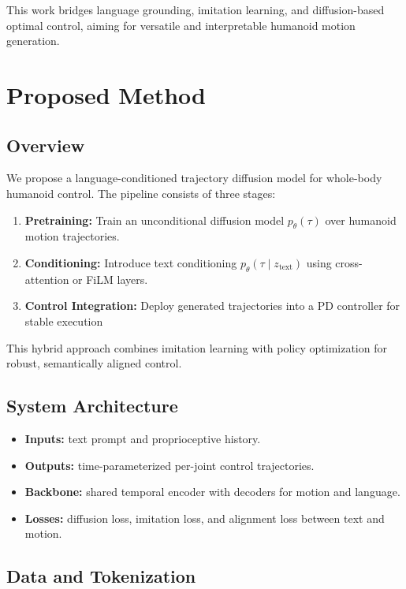 \documentclass{article}
\begin{document}
This work bridges language grounding, imitation learning, and diffusion-based optimal control, aiming for versatile and interpretable humanoid motion generation.

\section{Proposed Method}
\label{sec:method}

\subsection{Overview}

We propose a language-conditioned trajectory diffusion model for whole-body humanoid control. 
The pipeline consists of three stages:

\begin{enumerate}
    \item \textbf{Pretraining:} Train an unconditional diffusion model $p_\theta(\tau)$ over humanoid motion trajectories.
    \item \textbf{Conditioning:} Introduce text conditioning $p_\theta(\tau \mid z_{\text{text}})$ using cross-attention or FiLM layers.
    \item \textbf{Control Integration:} Deploy generated trajectories into a PD controller for stable execution
\end{enumerate}

This hybrid approach combines imitation learning with policy optimization for robust, semantically aligned control.

\subsection{System Architecture}

\begin{itemize}
    \item \textbf{Inputs:} text prompt and proprioceptive history.
    \item \textbf{Outputs:} time-parameterized per-joint control trajectories.
    \item \textbf{Backbone:} shared temporal encoder with decoders for motion and language.
    \item \textbf{Losses:} diffusion loss, imitation loss, and alignment loss between text and motion.
\end{itemize}

\subsection{Data and Tokenization}
\end{document}

